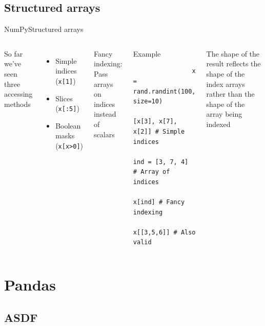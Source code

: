 \documentclass[10pt,compress]{beamer} %
\begin{document}
\subsection{Structured arrays}
\begin{frame}[fragile]{NumPy}{Structured arrays}
	\begin{columns}
	So far we've seen three accessing methods
	\begin{itemize}
		\item Simple indices (\texttt{x[1]})
		\item Slices (\texttt{x[:5]})
		\item Boolean masks (\texttt{x[x>0]})
	\end{itemize}
	Fancy indexing: Pass arrays on indices instead of scalars
		\begin{exampleblock}{\footnotesize{Example}}
		\vspace{-0.2cm} 
			\begin{lstlisting}
				x = rand.randint(100, size=10)
				[x[3], x[7], x[2]] # Simple indices
				ind = [3, 7, 4] # Array of indices
				x[ind] # Fancy indexing
				x[[3,5,6]] # Also valid
			\end{lstlisting}
		\vspace{-0.2cm} 
		\end{exampleblock}

		\footnotesize{
		\begin{alertblock}{}
		The shape of the result reflects the shape of the index arrays rather than the shape of the array being indexed
		\end{alertblock}
		}
	\end{columns}
\end{frame}

\section{Pandas}
\subsection{ASDF}
\end{document}
